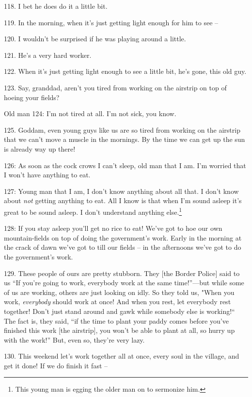 118. I bet he does do it a little bit.

119. In the morning, when it's just getting light enough for him to see --

120. I wouldn't be surprised if he was playing around a little.


121. He's a very hard worker.

122. When it's just getting light enough to see a little bit, he's gone, this old
guy.

123. Say, granddad, aren't you tired from working on the airstrip on top of hoeing
your fields?

Old man 124: I'm not tired at all. I'm not sick, you know.

125. Goddam, even young guys like us are so tired from working on the airstrip
that we can't move a muscle in the mornings. By the time we can get up the sun
is already way up there!

 126: As soon as the cock crows I can't sleep, old man
that I am. I'm worried that I won't have anything to eat.

 127: Young man that I am, I don't know anything about
all that. I don't know about \textit{not} getting anything to eat. All I know is
that when I'm sound asleep it's great to be sound asleep. I don't understand anything
else.\footnote{This young man is egging the older man on to sermonize him.}

 128: If you stay asleep you'll get no rice to eat!
We've got to hoe our own mountain-fields on top of doing the government's work.
Early in the morning at the crack of dawn we've got to till our fields -- in the
afternoons we've got to do the government's work.

129. These people of ours are pretty stubborn. They [the Border Police] said to
us ``If you're going to work, everybody work at the same time!''---but
while some of us are working, others are just looking on idly. So they told us,
"When you work, \textit{everybody} should work at once! And when you rest,
let everybody rest together! Don't just stand around and gawk while somebody else
is working!`` The fact is, they said, ``if the time to plant your
paddy comes before you've finished this work [the airstrip], you won't be able
to plant at all, so hurry up with the work!'' But, even so, they're very
lazy.

130. This weekend let's work together all at once, every soul in the village, and
get it done! If we do finish it fast --

